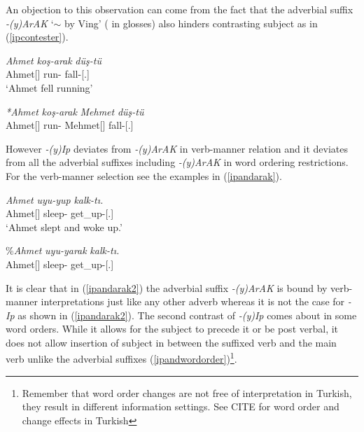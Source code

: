 An objection to this observation can come from the fact that the adverbial suffix \textit{-(y)ArAK} `$\sim$ by Ving' ({\By} in glosses) also hinders contrasting subject as in (\ref{ipcontester}).

\begin{exe}
    \ex \label{ipcontester}
    \begin{xlist}
    \ex
    \gll 
    \textit{Ahmet} \textit{koş-arak} \textit{düş-tü} \\ Ahmet[{\Nom}] run-{\By} fall-{\Pst}[{\Third}.{\Sg}] \\
    \glt `Ahmet fell running'
    
    \ex \gll 
    \textit{*Ahmet} \textit{koş-arak} \textit{Mehmet} \textit{düş-tü} \\ Ahmet[{\Nom}] run-{\By} Mehmet[{\Nom}] fall-{\Pst}[{\Third}.{\Sg}] \\
    \end{xlist}
\end{exe}

However \textit{-(y)Ip} deviates from \textit{-(y)ArAK} in verb-manner relation and it deviates from all the adverbial suffixes including \textit{-(y)ArAK} in word ordering restrictions. For the verb-manner selection see the examples in (\ref{ipandarak}).

\begin{exe}
    \ex \label{ipandarak}
    \begin{xlist}
        \ex \label{ipandarak1} \gll 
        \textit{Ahmet} \textit{uyu-yup} \textit{kalk-tı.} \\ Ahmet[{\Nom}] sleep-{\Pc} get\_up-{\Pst}[{\Third}.{\Sg}] \\
        \glt `Ahmet slept and woke up.'
        
        \ex \label{ipandarak2} \gll 
        {\%\textit{Ahmet}} \textit{uyu-yarak} \textit{kalk-tı.} \\ Ahmet[{\Nom}] sleep-{\By} get\_up-{\Pst}[{\Third}.{\Sg}] \\
    \end{xlist}
\end{exe}

It is clear that in (\ref{ipandarak2}) the adverbial suffix \textit{-(y)ArAK} is bound by verb-manner interpretations just like any other adverb whereas it is not the case for \textit{-Ip} as shown in (\ref{ipandarak2}). The second contrast of \textit{-(y)Ip} comes about in some word orders. While it allows for the subject to precede it or be post verbal, it does not allow insertion of subject in between the suffixed verb and the main verb unlike the adverbial suffixes (\ref{ipandwordorder})\footnote{Remember that word order changes are not free of interpretation in Turkish, they result in different information settings. See CITE for word order and change effects in Turkish}. 

